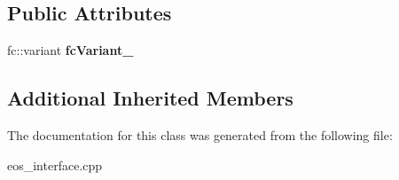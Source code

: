 \subsection*{Public Attributes}
\begin{DoxyCompactItemize}
\item 
\mbox{\label{classteos_1_1command_1_1_call_chain_a0afbe899ce8a5039702701e82f7ec9f2}} 
fc\+::variant {\bfseries fc\+Variant\+\_\+}
\end{DoxyCompactItemize}
\subsection*{Additional Inherited Members}


The documentation for this class was generated from the following file\+:\begin{DoxyCompactItemize}
\item 
eos\+\_\+interface.\+cpp\end{DoxyCompactItemize}
